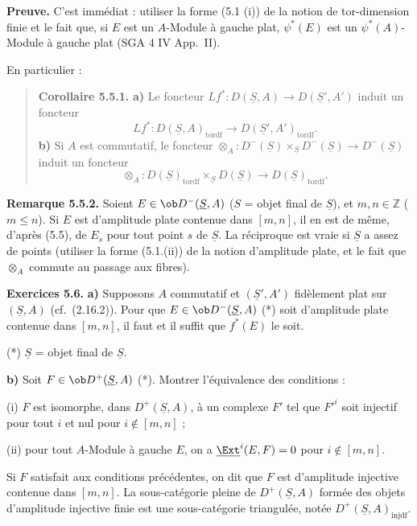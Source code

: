 \textbf{Preuve.} C'est immédiat : utiliser la forme (5.1 (i)) de la notion de tor-dimension finie et le fait que, si $E$ est un $A$-Module à gauche plat, $\psi^*(E)$ est un $\psi^*(A)$-Module à gauche plat (SGA 4 IV App.\ II).

En particulier :

\begin{quote}
\textbf{Corollaire 5.5.1.}
\textbf{a)} Le foncteur $Lf^* : D(\underline{S}, A) \to D(\underline{S}', A')$ induit un foncteur
\[
Lf^* : D(\underline{S}, A)_{\mathrm{tordf}} \longrightarrow D(\underline{S}', A')_{\mathrm{tordf}}.
\]
\textbf{b)} Si $A$ est commutatif, le foncteur $\otimes_A : D^-(\underline{S}) \times_{\underline{S}} D^-(\underline{S}) \to D^-(\underline{S})$ induit un foncteur
\[
\otimes_A : D(\underline{S})_{\mathrm{tordf}} \times_{\underline{S}} D(\underline{S}) \longrightarrow D(\underline{S})_{\mathrm{tordf}}.
\]
\end{quote}

\textbf{Remarque 5.5.2.} Soient $E \in \ob D^-(\underline{S}, A)$ ($S$ = objet final de $\underline{S}$), et $m, n \in \mathbb{Z}$ ($m \leqslant n$). Si $E$ est d'amplitude plate contenue dans $[m, n]$, il en est de même, d'après (5.5), de $E_s$ pour tout point $s$ de $\underline{S}$. La réciproque est vraie si $\underline{S}$ a assez de points (utiliser la forme (5.1.(ii)) de la notion d'amplitude plate, et le fait que $\otimes_A$ commute au passage aux fibres).

\textbf{Exercices 5.6.}
\textbf{a)} Supposons $A$ commutatif et $(\underline{S}', A')$ fidèlement plat sur $(\underline{S}, A)$ (cf.\ (2.16.2)). Pour que $E \in \ob D^-(\underline{S}, A)$ (*) soit d'amplitude plate contenue dans $[m, n]$, il faut et il suffit que $f^*(E)$ le soit.

(*) $\underline{S}$ = objet final de $\underline{S}$.

\textbf{b)} Soit $F \in \ob D^+(\underline{S}, A)$ (*). Montrer l'équivalence des conditions :

(i) $F$ est isomorphe, dans $D^+(\underline{S}, A)$, à un complexe $F'$ tel que $F'^i$ soit injectif pour tout $i$ et nul pour $i \notin [m, n]$ ;

(ii) pour tout $A$-Module à gauche $E$, on a $\underline{\Ext}^i(E, F) = 0$ pour $i \notin [m, n]$.

Si $F$ satisfait aux conditions précédentes, on dit que $F$ est d'amplitude injective contenue dans $[m, n]$. La sous-catégorie pleine de $D^+(\underline{S}, A)$ formée des objets d'amplitude injective finie est une sous-catégorie triangulée, notée $D^+(\underline{S}, A)_{\mathrm{injdf}}$.

